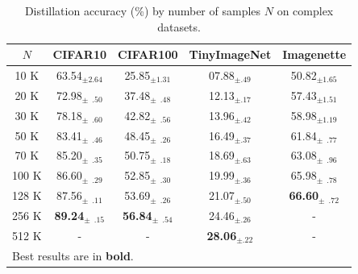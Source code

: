 \begin{table}[ht] %
    \caption{Distillation accuracy (\%) by number of samples $N$ on complex datasets.}
    \centering
    \begin{tabular}{c|c|c|c|c}
        \hline
            $N$ & \textbf{CIFAR10} & \textbf{CIFAR100} & \textbf{TinyImageNet} & \textbf{Imagenette} \\
        \hline
        \phantom{0}10 K &                    63.54$_{\pm 2.64}$ &                    25.85$_{\pm 1.31}$ &          07.88$_{\pm .49}$ &                    50.82$_{\pm 1.65}$ \\
        \phantom{0}20 K &          72.98$_{\pm \phantom{0}.50}$ &          37.48$_{\pm \phantom{0}.48}$ &          12.13$_{\pm .17}$ &                    57.43$_{\pm 1.51}$ \\
        \phantom{0}30 K &          78.18$_{\pm \phantom{0}.60}$ &          42.82$_{\pm \phantom{0}.56}$ &          13.96$_{\pm .42}$ &                    58.98$_{\pm 1.19}$ \\
        \phantom{0}50 K &          83.41$_{\pm \phantom{0}.46}$ &          48.45$_{\pm \phantom{0}.26}$ &          16.49$_{\pm .37}$ &          61.84$_{\pm \phantom{0}.77}$ \\
        \phantom{0}70 K &          85.20$_{\pm \phantom{0}.35}$ &          50.75$_{\pm \phantom{0}.18}$ &          18.69$_{\pm .63}$ &          63.08$_{\pm \phantom{0}.96}$ \\
                  100 K &          86.60$_{\pm \phantom{0}.29}$ &          52.85$_{\pm \phantom{0}.30}$ &          19.99$_{\pm .36}$ &          65.98$_{\pm \phantom{0}.78}$ \\
                  128 K &          87.56$_{\pm \phantom{0}.11}$ &          53.69$_{\pm \phantom{0}.26}$ &          21.07$_{\pm .50}$ & \textbf{66.60}$_{\pm \phantom{0}.72}$ \\
                  256 K & \textbf{89.24}$_{\pm \phantom{0}.15}$ & \textbf{56.84}$_{\pm \phantom{0}.54}$ &          24.46$_{\pm .26}$ &                                     - \\
                  512 K &                                     - &                                     - & \textbf{28.06}$_{\pm .22}$ &                                     - \\
        \hline
        \multicolumn{5}{l}{Best results are in \textbf{bold}.} \\
    \end{tabular}
    \label{tab:abla-nsamples-complex}
\end{table}

